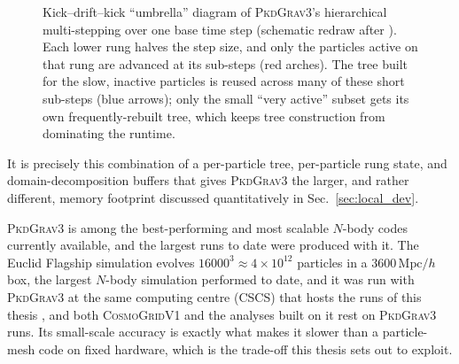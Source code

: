 \documentclass{report}
\begin{document}
\begin{figure}[h!]
\centering
{}
\caption{Kick--drift--kick ``umbrella'' diagram of \textsc{PkdGrav3}'s hierarchical multi-stepping over one base time step (schematic redraw after \cite{potter_pkdgrav3_2016}). Each lower rung halves the step size, and only the particles active on that rung are advanced at its sub-steps (red arches). The tree built for the slow, inactive particles is reused across many of these short sub-steps (blue arrows); only the small ``very active'' subset gets its own frequently-rebuilt tree, which keeps tree construction from dominating the runtime.}
\label{fig:pkd_rungs}
\end{figure}

It is precisely this combination of a per-particle tree, per-particle rung state, and domain-decomposition buffers that gives \textsc{PkdGrav3} the larger, and rather different, memory footprint discussed quantitatively in Sec.~\ref{sec:local_dev}.

\textsc{PkdGrav3} is among the best-performing and most scalable \mbox{$N$}-body codes currently available, and the largest runs to date were produced with it. The Euclid Flagship simulation evolves \mbox{$16000^3 \approx 4\times10^{12}$} particles in a \mbox{$3600\,\mathrm{Mpc}/h$} box, the largest \mbox{$N$}-body simulation performed to date, and it was run with \textsc{PkdGrav3} at the same computing centre (CSCS) that hosts the runs of this thesis \cite{collaboration_euclid_2025}, and both \textsc{CosmoGridV1} \cite{kacprzak_cosmogridv1_2023} and the analyses built on it \cite{fluri_full_2022, thomsen_dark_2026} rest on \textsc{PkdGrav3} runs. Its small-scale accuracy is exactly what makes it slower than a particle-mesh code on fixed hardware, which is the trade-off this thesis sets out to exploit.
\end{document}
